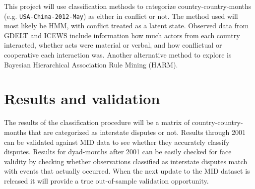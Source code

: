 \documentclass[twoside]{article}
\begin{document}

This project will use classification methods to categorize country-country-months (e.g. \texttt{USA-China-2012-May}) as either in conflict or not. The method used will most likely be HMM, with conflict treated as a latent state. Observed data from GDELT and ICEWS include information how much actors from each country interacted, whether acts were material or verbal, and how conflictual or cooperative each interaction was. Another alternative method to explore is Bayesian Hierarchical Association Rule Mining (HARM). 


\section{Results and validation}


The results of the classification procedure will be a matrix of country-country-months that are categorized as interstate disputes or not. Results through 2001 can be validated against MID data to see whether they accurately classify disputes. Results for dyad-months after 2001 can be easily checked for face validity by checking whether observations classified as interstate disputes match with events that actually occurred. When the next update to the MID dataset is released it will provide a true out-of-sample validation opportunity. 


\end{document}
